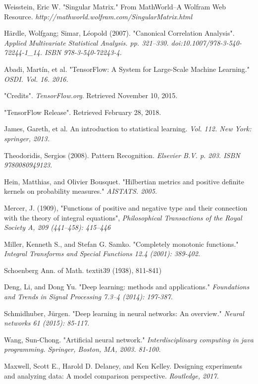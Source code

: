 \documentclass[12pt]{report} %
\begin{document}
\begin{thebibliography}{}
	Weisstein, Eric W. "Singular Matrix." From MathWorld--A Wolfram Web Resource. \textit{http://mathworld.wolfram.com/SingularMatrix.html}

	Härdle, Wolfgang; Simar, Léopold (2007). "Canonical Correlation Analysis". \textit{Applied Multivariate Statistical Analysis. pp. 321–330. doi:10.1007/978-3-540-72244-1\_14. ISBN 978-3-540-72243-4.}

	Abadi, Martín, et al. "TensorFlow: A System for Large-Scale Machine Learning."
	\textit{OSDI. Vol. 16. 2016.}

	"Credits". \textit{TensorFlow.org}. Retrieved November 10, 2015.

	"TensorFlow Release". Retrieved February 28, 2018.

	James, Gareth, et al. An introduction to statistical learning.
	\textit{Vol. 112. New York: springer, 2013.}

	Theodoridis, Sergios (2008). Pattern Recognition. \textit{Elsevier B.V. p. 203. ISBN 9780080949123.}

	Hein, Matthias, and Olivier Bousquet. "Hilbertian metrics and positive definite kernels on probability measures."
	\textit{AISTATS. 2005.}

	Mercer, J. (1909), "Functions of positive and negative type and their connection with the theory of integral equations", \textit{Philosophical Transactions of the Royal Society A, 209 (441–458): 415–446}

    Miller, Kenneth S., and Stefan G. Samko. "Completely monotonic functions." \textit{Integral Transforms and Special Functions 12.4 (2001): 389-402.}

	Schoenberg Ann. of Math. textit{39 (1938), 811-841)}

	Deng, Li, and Dong Yu. "Deep learning: methods and applications." \textit{Foundations and Trends in Signal Processing 7.3–4 (2014): 197-387.}

	Schmidhuber, Jürgen. "Deep learning in neural networks: An overview." \textit{Neural networks 61 (2015): 85-117.}

	Wang, Sun-Chong. "Artificial neural network." \textit{Interdisciplinary computing in java programming. Springer, Boston, MA, 2003. 81-100.}

	Maxwell, Scott E., Harold D. Delaney, and Ken Kelley. Designing experiments and analyzing data: A model comparison perspective. \textit{Routledge, 2017.}


\end{thebibliography}
\end{document}
